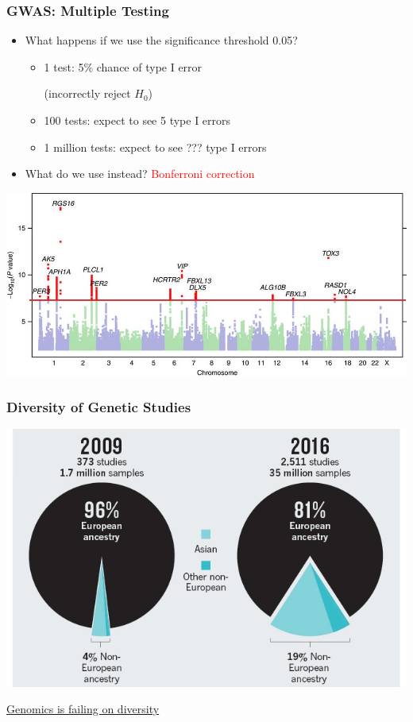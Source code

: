 \documentclass[12pt, 
hyperref={colorlinks=true, linkcolor=blue, urlcolor=cyan},dvipsnames]{beamer}
\begin{document}
\begin{frame}
\frametitle{GWAS: Multiple Testing}
\begin{itemize}
\item What happens if we use the significance threshold 0.05? \pause
	\begin{itemize}
	\item 1 test: 5\% chance of type I error \begin{footnotesize}(incorrectly reject $H_0$) \end{footnotesize} \pause
	\item 100 tests: expect to see 5 type I errors \pause
	\item 1 million tests: expect to see ??? type I errors \pause
	\end{itemize}
\item What do we use instead? \pause \textcolor{red}{Bonferroni correction} 
\end{itemize}

\includegraphics[width=\textwidth]{figs/morning_manhattan}

\end{frame}

\begin{frame}
\frametitle{Diversity of Genetic Studies}

\centering
\includegraphics[width=\textwidth]{figs/genetic_diversity}
\begin{small} \href{https://www.nature.com/news/genomics-is-failing-on-diversity-1.20759}{Genomics is failing on diversity} \end{small}

\end{frame}
\end{document}
